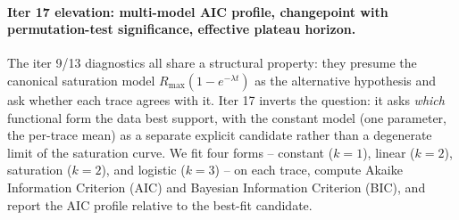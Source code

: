 \documentclass{article}
\begin{document}
\paragraph{Iter 17 elevation: multi-model AIC profile, changepoint with permutation-test significance, effective plateau horizon.}
\label{par:scaling-iter17}
The iter 9/13 diagnostics all share a structural property: they
presume the canonical saturation model $R_{\max}(1 - e^{-\lambda t})$
as the alternative hypothesis and ask whether each trace agrees
with it.  Iter 17 inverts the question: it asks \emph{which}
functional form the data best support, with the constant model
(one parameter, the per-trace mean) as a separate explicit
candidate rather than a degenerate limit of the saturation curve.
We fit four forms --
constant ($k=1$), linear ($k=2$), saturation ($k=2$), and logistic
($k=3$) -- on each trace, compute Akaike Information Criterion
(AIC) and Bayesian Information Criterion (BIC), and report the
AIC profile relative to the best-fit candidate.
\end{document}
